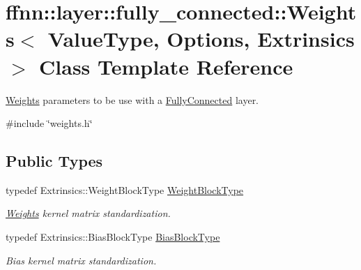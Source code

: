 \hypertarget{classffnn_1_1layer_1_1fully__connected_1_1_weights}{\section{ffnn\-:\-:layer\-:\-:fully\-\_\-connected\-:\-:Weights$<$ Value\-Type, Options, Extrinsics $>$ Class Template Reference}
\label{classffnn_1_1layer_1_1fully__connected_1_1_weights}
}


\hyperlink{classffnn_1_1layer_1_1fully__connected_1_1_weights}{Weights} parameters to be use with a \hyperlink{classffnn_1_1layer_1_1_fully_connected}{Fully\-Connected} layer.  




{\ttfamily \#include \char`\"{}weights.\-h\char`\"{}}

\subsection*{Public Types}
\begin{DoxyCompactItemize}
\item 
typedef Extrinsics\-::\-Weight\-Block\-Type \hyperlink{classffnn_1_1layer_1_1fully__connected_1_1_weights_a60cdcf8a80260e8558f1e64f8a0a8218}{Weight\-Block\-Type}
\begin{DoxyCompactList}\small\item\em \hyperlink{classffnn_1_1layer_1_1fully__connected_1_1_weights}{Weights} kernel matrix standardization. \end{DoxyCompactList}\item 
typedef Extrinsics\-::\-Bias\-Block\-Type \hyperlink{classffnn_1_1layer_1_1fully__connected_1_1_weights_a6f5ad97bf46dac9d55752b5117768957}{Bias\-Block\-Type}
\begin{DoxyCompactList}\small\item\em Bias kernel matrix standardization. \end{DoxyCompactList}\end{DoxyCompactItemize}
